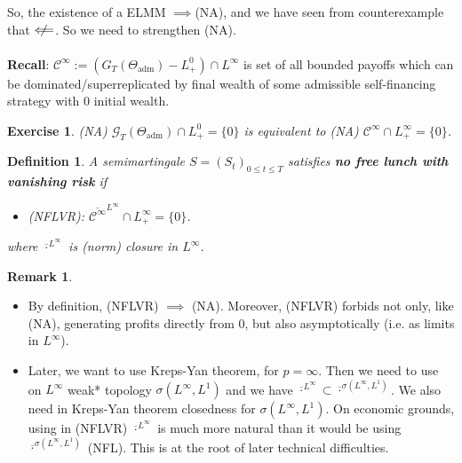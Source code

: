 \documentclass[12pt,a4paper, twoside]{article}
\newtheorem{defn}{Definition}[section]
\newtheorem{exe}{Exercise}[section]
\theoremstyle{definition}
\newtheorem{rem}{Remark}[section]
\begin{document}
So, the existence of a ELMM $\implies $(NA), and we have seen from counterexample that $\centernot\Longleftarrow$. So we need to strengthen (NA). 
\\\\
\textbf{Recall}: $\mathcal{C}^\infty := ( G_T( \Theta_\text{adm})-L_+^0) \cap L^\infty$ is set of all bounded payoffs which can be dominated/superreplicated by final wealth of some admissible self-financing strategy with $0$ initial wealth. 
\begin{exe} \label{ex13} (NA) $\mathcal{G}_T( \Theta_\text{adm}) \cap L_+^0 = \{0\}$ is equivalent to (NA) $\mathcal{C}^\infty \cap L_+^\infty = \{0 \}$. 
\end{exe}
\begin{mdframed}[backgroundcolor=yellow!20, topline=true, linewidth=2.0pt]
\begin{defn}
A semimartingale $S=(S_t)_{0 \leq t \leq T}$ satisfies \textbf{no free lunch with vanishing risk} if 
\begin{itemize}
\item (NFLVR): $\overline{\mathcal{C}^\infty}^{L^\infty} \cap L_+^\infty = \{0 \}$. 
\end{itemize}
where $\overline{\cdot}^{L^\infty}$ is (norm) closure in $L^\infty$. 
\end{defn}
\end{mdframed}
\newpage
\begin{rem} \ \begin{itemize}
\item By definition, (NFLVR) $\implies$ (NA). Moreover, (NFLVR) forbids not only, like (NA), generating profits directly from $0$, but also asymptotically (i.e. as limits in $L^\infty$).
\item Later, we want to use Kreps-Yan theorem, for $p= \infty$. Then we need to use on $L^\infty$ weak* topology $\sigma( L^\infty, L^1)$ and we have $\overline{\cdot}^{L^\infty} \subset \overline{\cdot}^{\sigma(L^\infty, L^1)}$. We also need in Kreps-Yan theorem closedness for $\sigma(L^\infty, L^1)$. On economic grounds, using in (NFLVR) $\overline{\cdot}^{L^\infty}$ is much more natural than it would be using $\overline{\cdot}^{\sigma(L^\infty, L^1)}$ (NFL). This is at the root of later technical difficulties. 
\end{itemize}
\end{rem}
\end{document}
